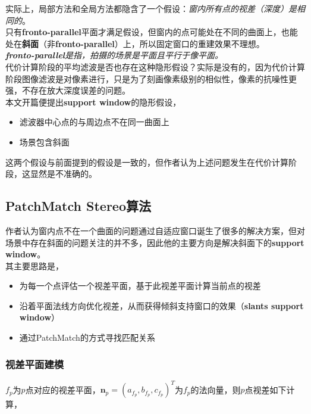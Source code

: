 实际上，局部方法和全局方法都隐含了一个假设：\textit{窗内所有点的视差（深度）是相同的}。\\

只有\textbf{fronto-parallel}平面才满足假设，但窗内的点可能处在不同的曲面上，也能处在\textbf{斜面}（非\textbf{fronto-parallel}）上，所以固定窗口的重建效果不理想。\\

\textit{\textbf{fronto-parallel}是指，拍摄的场景是平面且平行于像平面。}\\

代价计算阶段的平均滤波是否也存在这种隐形假设？实际是没有的，因为代价计算阶段图像滤波是对像素进行，只是为了刻画像素级别的相似性，像素的抗噪性更强，不存在放大深度误差的问题。\\

本文开篇便提出\textbf{support window}的隐形假设，
\begin{itemize}
	\item 滤波器中心点的与周边点不在同一曲面上
	\item 场景包含斜面
\end{itemize}

这两个假设与前面提到的假设是一致的，但作者认为上述问题发生在代价计算阶段，这显然是不准确的。

\subsection{PatchMatch Stereo算法}

作者认为窗内点不在一个曲面的问题通过自适应窗口诞生了很多的解决方案，但对场景中存在斜面的问题关注的并不多，因此他的主要方向是解决斜面下的\textbf{support window}。\\

其主要思路是，
\begin{itemize}
	\item 为每一个点评估一个视差平面，基于此视差平面计算当前点的视差
	\item 沿着平面法线方向优化视差，从而获得倾斜支持窗口的效果（\textbf{slants support window}）
	\item 通过PatchMatch的方式寻找匹配关系
\end{itemize}


\subsubsection*{视差平面建模}

$f_p$为$p$点对应的视差平面，$\mathbf{n}_p = (a_{f_p}, b_{f_p}, c_{f_p})^T$为$f_p$的法向量，则$p$点视差如下计算，

